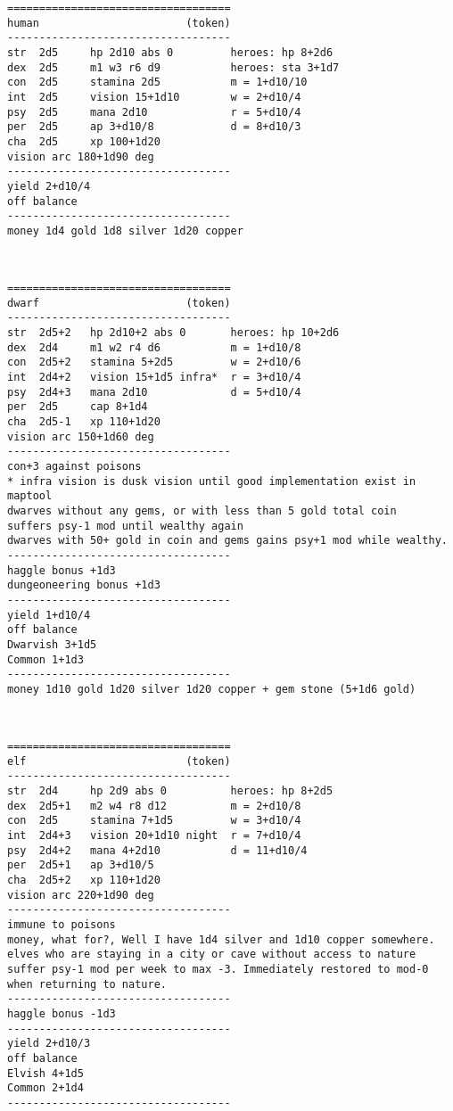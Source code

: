 \small
\goodbreak \begin{samepage} \begin{verbatim}
===================================
human                       (token)
-----------------------------------
str  2d5     hp 2d10 abs 0         heroes: hp 8+2d6
dex  2d5     m1 w3 r6 d9           heroes: sta 3+1d7
con  2d5     stamina 2d5           m = 1+d10/10
int  2d5     vision 15+1d10        w = 2+d10/4
psy  2d5     mana 2d10             r = 5+d10/4
per  2d5     ap 3+d10/8            d = 8+d10/3
cha  2d5     xp 100+1d20
vision arc 180+1d90 deg
-----------------------------------
yield 2+d10/4
off balance
-----------------------------------
money 1d4 gold 1d8 silver 1d20 copper
\end{verbatim} \end{samepage}

\

\goodbreak \begin{samepage} \begin{verbatim}
===================================
dwarf                       (token)
-----------------------------------
str  2d5+2   hp 2d10+2 abs 0       heroes: hp 10+2d6
dex  2d4     m1 w2 r4 d6           m = 1+d10/8
con  2d5+2   stamina 5+2d5         w = 2+d10/6
int  2d4+2   vision 15+1d5 infra*  r = 3+d10/4
psy  2d4+3   mana 2d10             d = 5+d10/4
per  2d5     cap 8+1d4
cha  2d5-1   xp 110+1d20
vision arc 150+1d60 deg
-----------------------------------
con+3 against poisons
* infra vision is dusk vision until good implementation exist in maptool
dwarves without any gems, or with less than 5 gold total coin
suffers psy-1 mod until wealthy again
dwarves with 50+ gold in coin and gems gains psy+1 mod while wealthy.
-----------------------------------
haggle bonus +1d3
dungeoneering bonus +1d3
-----------------------------------
yield 1+d10/4
off balance
Dwarvish 3+1d5
Common 1+1d3
-----------------------------------
money 1d10 gold 1d20 silver 1d20 copper + gem stone (5+1d6 gold)
\end{verbatim} \end{samepage}

\

\goodbreak \begin{samepage} \begin{verbatim}
===================================
elf                         (token)
-----------------------------------
str  2d4     hp 2d9 abs 0          heroes: hp 8+2d5
dex  2d5+1   m2 w4 r8 d12          m = 2+d10/8
con  2d5     stamina 7+1d5         w = 3+d10/4
int  2d4+3   vision 20+1d10 night  r = 7+d10/4
psy  2d4+2   mana 4+2d10           d = 11+d10/4
per  2d5+1   ap 3+d10/5
cha  2d5+2   xp 110+1d20
vision arc 220+1d90 deg
-----------------------------------
immune to poisons
money, what for?, Well I have 1d4 silver and 1d10 copper somewhere.
elves who are staying in a city or cave without access to nature
suffer psy-1 mod per week to max -3. Immediately restored to mod-0
when returning to nature.
-----------------------------------
haggle bonus -1d3
-----------------------------------
yield 2+d10/3
off balance
Elvish 4+1d5
Common 2+1d4
-----------------------------------
\end{verbatim} \end{samepage}

